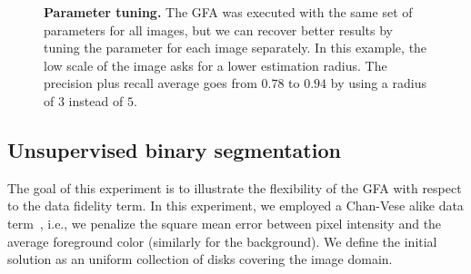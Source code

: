 \documentclass[review]{siamart220329}
\begin{document}
\begin{figure}
\center
{}\hspace{1em}
\caption{\textbf{Parameter tuning.} The GFA was executed with the same set of parameters for all images, but we can recover better results by tuning the parameter for each image separately. In this example, the low scale of the image asks for a lower estimation radius. The precision plus recall average goes from $0.78$ to $0.94$ by using a radius of $3$ instead of $5$. }
\label{fig:coco-parameter-tuning}
\end{figure}
%
%
\subsection{Unsupervised binary segmentation}
The goal of this experiment is to illustrate the flexibility of the GFA with respect to the data fidelity term. In this experiment, we employed a Chan-Vese alike data term~\cite{chan01}, i.e., we penalize the square mean error between pixel intensity and the average foreground color (similarly for the background). We define the initial solution as an uniform collection of disks covering the image domain.
\end{document}
